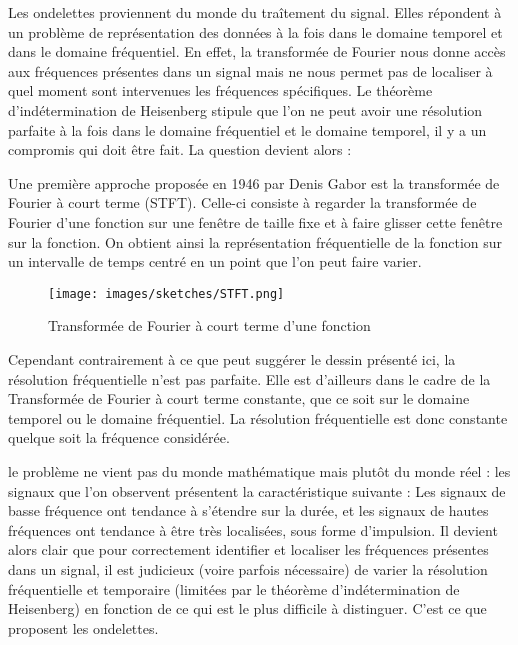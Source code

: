 
Les ondelettes proviennent du monde du traîtement du signal. Elles répondent à un problème de représentation des données à la fois dans le domaine temporel et dans le domaine fréquentiel. En effet, la transformée de Fourier nous donne accès aux fréquences présentes dans un signal mais ne nous permet pas de localiser à quel moment sont intervenues les fréquences spécifiques. Le théorème d'indétermination de Heisenberg stipule que l'on ne peut avoir une résolution parfaite à la fois dans le domaine fréquentiel et le domaine temporel, il y a un compromis qui doit être fait. La question devient alors :


Une première approche proposée en 1946 par Denis Gabor est la transformée de Fourier à court terme (STFT). Celle-ci consiste à regarder la transformée de Fourier d'une fonction sur une fenêtre de taille fixe et à faire glisser cette fenêtre sur la fonction. On obtient ainsi la représentation fréquentielle de la fonction sur un intervalle de temps centré en un point que l'on peut faire varier.

\bigskip

\begin{minipage}{0.32 \textwidth}
	\begin{figure}[H]
		\centering
		\texttt{[image: images/sketches/STFT.png]}
		\caption{Transformée de Fourier à court terme d'une fonction}
		\label{fig:STFT}
	\end{figure}
\end{minipage}
\hfill
\begin{minipage}{0.60 \textwidth}

	Cependant contrairement à ce que peut suggérer le dessin présenté ici, la résolution fréquentielle n'est pas parfaite. Elle est d'ailleurs dans le cadre de la Transformée de Fourier à court terme constante, que ce soit sur le domaine temporel ou le domaine fréquentiel. La résolution fréquentielle est donc constante quelque soit la fréquence considérée.


	le problème ne vient pas du monde mathématique mais plutôt du monde réel : les signaux que l'on observent présentent la caractéristique suivante : Les signaux de basse fréquence ont tendance à s'étendre sur la durée, et les signaux de hautes fréquences ont tendance à être très localisées, sous forme d'impulsion. Il devient alors clair que pour correctement identifier et localiser les fréquences présentes dans un signal, il est judicieux (voire parfois nécessaire) de varier la résolution fréquentielle et temporaire (limitées par le théorème d'indétermination de Heisenberg) en fonction de ce qui est le plus difficile à distinguer. C'est ce que proposent les ondelettes.

\end{minipage}